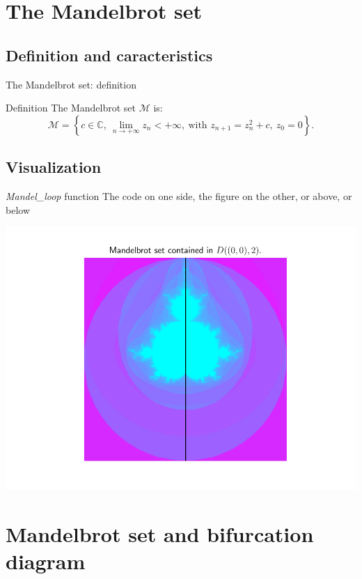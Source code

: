 \documentclass[11pt, compress]{beamer}
\theoremstyle{definition}
\begin{document}
\section[Mandelbrot]{The Mandelbrot set}
\subsection{Definition and caracteristics}
\begin{frame}{The Mandelbrot set: definition}

\begin{block}{Definition}
The Mandelbrot set $\mathcal{M}$ is:
$$\mathcal{M}=\left\{ c\in\mathbb{C},\ \lim_{n\rightarrow +\infty} z_n <+\infty,\ \text{with } z_{n+1}=z_n^2+c,\ z_0=0\right\}.$$
\end{block}

\end{frame}

\subsection{Visualization}
\begin{frame}{\emph{Mandel\_loop } function}
The code on one side, the figure on the other, or above, or below


\begin{center}
    \includegraphics[scale=0.55]{mandelbrot.pdf}
\end{center}
\end{frame}




\section[Link]{Mandelbrot set and bifurcation diagram}
\end{document}
